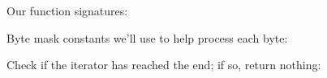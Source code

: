 \documentclass[../index.tex]{subfiles}
\begin{document}
%
%
%
%
%
%
%
%
%
\begin{frame}{\currenttitle}
  Our function signatures:
  \vspace*{1em}

\end{frame}

\begin{frame}{\currenttitle}
  Byte mask constants we'll use to help process each byte:
  \vspace*{1em}

\end{frame}

\newcommand{\decodercodelisting}[2]{%
}
\begin{frame}{\currenttitle}
%
  Check if the iterator has reached the end; if so, return nothing: \\
  \vspace*{1em}
  \decodercodelisting{8}{13}
\end{frame}
\end{document}
